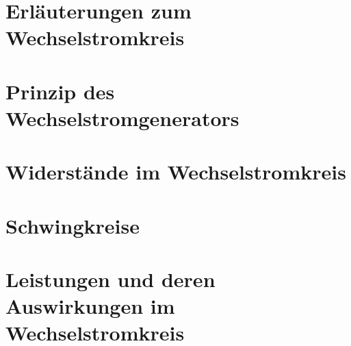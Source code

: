\section{Erläuterungen zum Wechselstromkreis}				\label{sec:Erlaeuterungen}


\section{Prinzip des Wechselstromgenerators}				\label{sec:Generator}


\section{Widerstände im Wechselstromkreis}					\label{sec:Widerstaende}


\section{Schwingkreise}										\label{sec:Schwingkreise}


\section[Leistungen im Wechselstromkreis]{Leistungen und deren Auswirkungen im Wechselstromkreis}	\label{sec:Leistungen}

